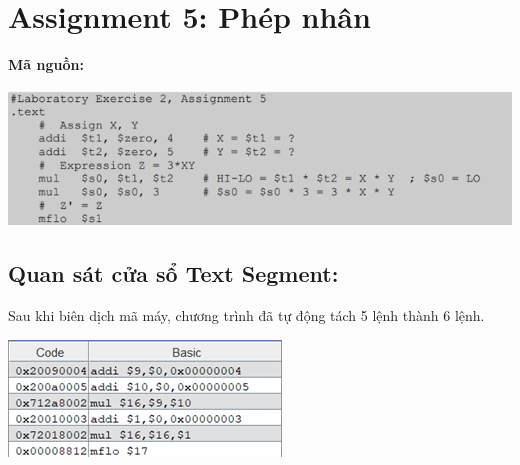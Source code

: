 \documentclass[12pt,a4paper,oneside]{article}
\begin{document}
\section{Assignment 5: Phép nhân}
	\textbf{Mã nguồn:}
		\begin{center}
		\includegraphics[scale=1]{image/14}
		\end{center}
	\subsection{Quan sát cửa sổ Text Segment:}
	Sau khi biên dịch mã máy, chương trình đã tự động tách 5 lệnh thành 6 lệnh.
		\begin{center}
		\includegraphics[scale=1.2]{image/15}
		\end{center}
\end{document}
